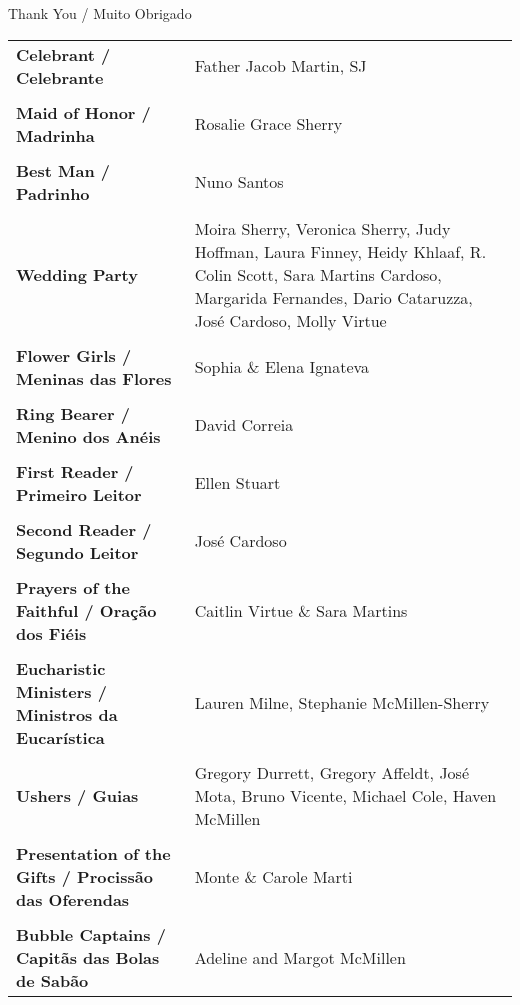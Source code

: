 \centering
{\Large Thank You / Muito Obrigado}

\setlength\extrarowheight{-3pt} 
\begin{longtable}{p{1.7in}p{1.7in}}
{\bf Celebrant / Celebrante} & Father Jacob Martin, SJ\\
\\

{\bf Maid of Honor / Madrinha} & Rosalie Grace Sherry\\
\\

{\bf Best Man / Padrinho} & Nuno Santos\\
\\

{\bf Wedding Party} & Moira Sherry, Veronica Sherry, Judy Hoffman, Laura Finney, Heidy Khlaaf, R. Colin Scott, Sara Martins Cardoso, Margarida Fernandes, Dario Cataruzza, José Cardoso, Molly Virtue\\
\\

{\bf Flower Girls / Meninas das Flores} & Sophia \& Elena Ignateva\\
\\

{\bf Ring Bearer / Menino dos Anéis} & David Correia\\
\\

{\bf First Reader / Primeiro Leitor} & Ellen Stuart\\
\\

{\bf Second Reader / Segundo Leitor} & José Cardoso \\
\\

{\bf Prayers of the Faithful /  Oração dos Fiéis} & Caitlin Virtue \& Sara Martins \\
\\

{\bf Eucharistic Ministers / Ministros da Eucarística} & Lauren Milne, Stephanie McMillen-Sherry\\
\\

{\bf Ushers / Guias} & Gregory Durrett, Gregory Affeldt, José Mota, Bruno Vicente, Michael Cole, Haven McMillen\\
\\

{\bf Presentation of the Gifts / Procissão das Oferendas} & Monte \& Carole Marti\\
\\

{\bf Bubble Captains / Capitãs das Bolas de Sabão} & Adeline and Margot McMillen\\

\end{longtable}

